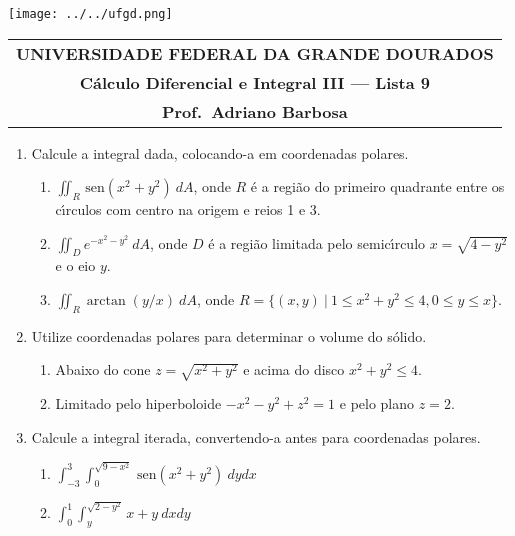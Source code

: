 \documentclass[a4paper,5pt]{amsbook}
\newcommand{\sen}{\,\mbox{sen}}
\newcommand{\ds}{\displaystyle}
\begin{document}
\thispagestyle{empty}
\pagestyle{empty}
\begin{minipage}[h]{0.14\textwidth}
	\texttt{[image: ../../ufgd.png]}
\end{minipage}
\begin{minipage}[h]{\textwidth}
\begin{tabular}{c}
{{\bf UNIVERSIDADE FEDERAL DA GRANDE DOURADOS}}\\
{{\bf C\'alculo Diferencial e Integral III --- Lista 9}}\\
{{\bf Prof.\ Adriano Barbosa}}\\
\end{tabular}
\vspace{-0.45cm}
%
\end{minipage}


\vspace{1cm}
\begin{enumerate}
    \setlength\itemsep{0.5cm}
    \item Calcule a integral dada, colocando-a em coordenadas polares.
        \begin{enumerate}
            \setlength\itemsep{0.3cm}
            \item $\ds\iint_R \sen{(x^2+y^2)}\ dA$, onde $R$ \'e a regi\~ao do
            primeiro quadrante entre os c\'{\i}rculos com centro na origem e reios 1
            e 3.
            \item $\ds\iint_D e^{-x^2-y^2}\ dA$, onde $D$ \'e a regi\~ao limitada
            pelo semic\'{\i}rculo $x=\sqrt{4-y^2}$ e o eio $y$.
            \item $\ds\iint_R \arctan{(y/x)}\ dA$, onde $R=\{(x,y)\ |\ 1\le
            x^2+y^2\le 4, 0\le y\le x\}$.
        \end{enumerate}

    \item Utilize coordenadas polares para determinar o volume do s\'olido.
        \begin{enumerate}
            \setlength\itemsep{0.3cm}
            \item Abaixo do cone $z=\sqrt{x^2+y^2}$ e acima do disco
            $x^2+y^2\le 4$.
            \item Limitado pelo hiperboloide $-x^2-y^2+z^2=1$ e pelo plano
            $z=2$.
        \end{enumerate}

    \item Calcule a integral iterada, convertendo-a antes para coordenadas
    polares.
        \begin{enumerate}
            \setlength\itemsep{0.3cm}
            \item $\ds\int_{-3}^{3} \int_0^{\sqrt{9-x^2}} \sen{(x^2+y^2)}\ dydx$
            \item $\ds\int_0^1 \int_y^{\sqrt{2-y^2}} x+y\ dxdy$
        \end{enumerate}
\end{enumerate}
\end{document}
